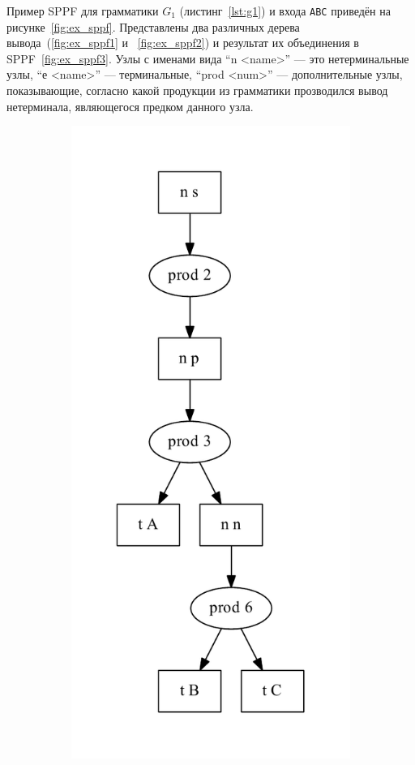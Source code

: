 Пример SPPF для грамматики $G_1$ (листинг~\ref{lst:g1}) и входа \verb|ABC| приведён на рисунке~\ref{fig:ex_sppf}. Представлены два различных дерева вывода~(\ref{fig:ex_sppf1} и ~\ref{fig:ex_sppf2}) и результат их объединения в SPPF~\ref{fig:ex_sppf3}. Узлы с именами вида ``n <name>'' --- это нетерминальные узлы, ``е <name>'' --- терминальные, ``prod <num>'' --- дополнительные узлы, показывающие, согласно какой продукции из грамматики прозводился вывод нетерминала, являющегося предком данного узла.  

\begin{figure}[h!]
\centering
   \begin{subfigure}[b]{0.3\textwidth}
       \includegraphics[width=\textwidth]{pics/ex_sppf1}

\end{subfigure}
\end{figure}
